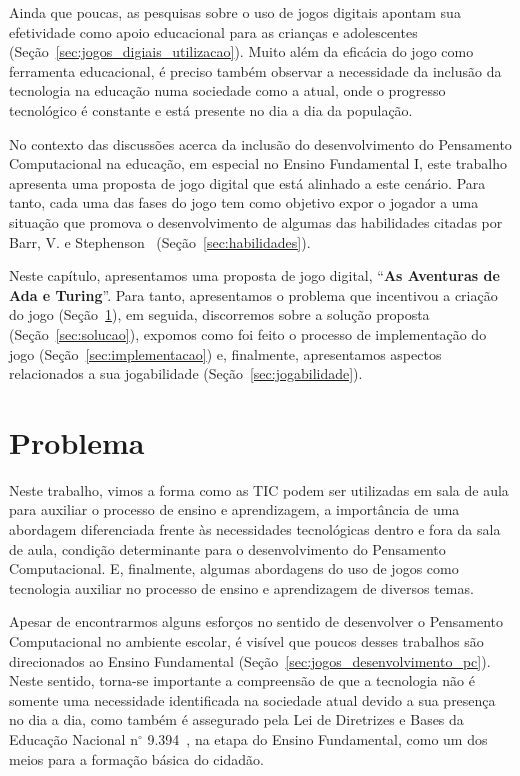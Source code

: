 Ainda que poucas, as pesquisas sobre o uso de jogos digitais apontam sua efetividade como apoio educacional para as crianças e adolescentes (Seção~\ref{sec:jogos_digiais_utilizacao}). Muito além da eficácia do jogo como ferramenta educacional, é preciso também observar a necessidade da inclusão da tecnologia na educação numa sociedade como a atual, onde o progresso tecnológico é constante e está presente no dia a dia da população.

No contexto das discussões acerca da inclusão do desenvolvimento do Pensamento Computacional na educação, em especial no Ensino Fundamental I, este trabalho apresenta uma proposta de jogo digital que está alinhado a este cenário. Para tanto, cada uma das fases do jogo tem como objetivo expor o jogador a uma situação que promova o desenvolvimento de algumas das habilidades citadas por Barr, V. e Stephenson~\cite{barr_bringing_2011} (Seção~\ref{sec:habilidades}).

Neste capítulo, apresentamos uma proposta de jogo digital, “\textbf{As Aventuras de Ada e Turing}”. Para tanto, apresentamos o problema que incentivou a criação do jogo (Seção~\ref{sec:problema}), em seguida, discorremos sobre a solução proposta (Seção~\ref{sec:solucao}), expomos como foi feito o processo de implementação do jogo (Seção~\ref{sec:implementacao}) e, finalmente, apresentamos aspectos relacionados a sua jogabilidade (Seção~\ref{sec:jogabilidade}).

\section{Problema} \label{sec:problema}

Neste trabalho, vimos a forma como as \acrlong{TIC} podem ser utilizadas em sala de aula para auxiliar o processo de ensino e aprendizagem, a importância de uma abordagem diferenciada frente às necessidades tecnológicas dentro e fora da sala de aula, condição determinante para o desenvolvimento do Pensamento Computacional. E, finalmente, algumas abordagens do uso de jogos como tecnologia auxiliar no processo de ensino e aprendizagem de diversos temas.

Apesar de encontrarmos alguns esforços no sentido de desenvolver o Pensamento Computacional no ambiente escolar, é visível que poucos desses trabalhos são direcionados ao Ensino Fundamental (Seção~\ref{sec:jogos_desenvolvimento_pc}). Neste sentido, torna-se importante a compreensão de que a tecnologia não é somente uma necessidade identificada na sociedade atual devido a sua presença no dia a dia, como também é assegurado pela Lei de Diretrizes e Bases da Educação Nacional n$^{\circ}$ 9.394~\cite{brasil_lei_1996}, na etapa do Ensino Fundamental, como um dos meios para a formação básica do cidadão.

